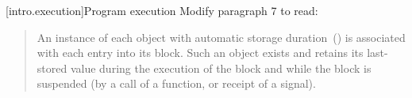 \setcounter{section}{8}
[intro.execution]{Program execution}
Modify paragraph 7 to read:
\begin{quote}
\setcounter{Paras}{6}
\pnum 
An instance of each object with automatic storage 
duration~() is associated with each entry into its 
block. Such an object exists and retains its last-stored value during 
the execution of the block and while the block is suspended (by a call 
of a function, 
or receipt of a signal). 
\end{quote}
